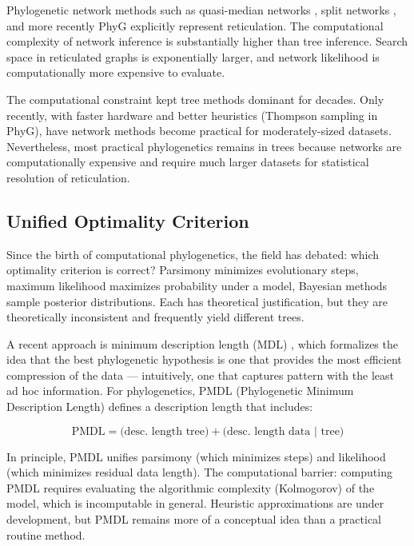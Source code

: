 Phylogenetic network methods such as quasi-median networks \parencite{holland2004}, split networks \parencite{bryant2004}, and more recently PhyG \parencite{wheeler2024a} explicitly represent reticulation. The computational complexity of network inference is substantially higher than tree inference. Search space in reticulated graphs is exponentially larger, and network likelihood is computationally more expensive to evaluate.

The computational constraint kept tree methods dominant for decades. Only recently, with faster hardware and better heuristics (Thompson sampling in PhyG), have network methods become practical for moderately-sized datasets. Nevertheless, most practical phylogenetics remains in trees because networks are computationally expensive and require much larger datasets for statistical resolution of reticulation.

\subsection{Unified Optimality Criterion}

Since the birth of computational phylogenetics, the field has debated: which optimality criterion is correct? Parsimony minimizes evolutionary steps, maximum likelihood maximizes probability under a model, Bayesian methods sample posterior distributions. Each has theoretical justification, but they are theoretically inconsistent and frequently yield different trees.

A recent approach is minimum description length (MDL) \parencite{wheeler2025}, which formalizes the idea that the best phylogenetic hypothesis is one that provides the most efficient compression of the data --- intuitively, one that captures pattern with the least ad hoc information. For phylogenetics, PMDL (Phylogenetic Minimum Description Length) \parencite{wheeler2025} defines a description length that includes:

\begin{equation}
\text{PMDL} = \text{(desc. length tree)} + \text{(desc. length data | tree)}
\end{equation}

In principle, PMDL unifies parsimony (which minimizes steps) and likelihood (which minimizes residual data length). The computational barrier: computing PMDL requires evaluating the algorithmic complexity (Kolmogorov) of the model, which is incomputable in general. Heuristic approximations are under development, but PMDL remains more of a conceptual idea than a practical routine method.

